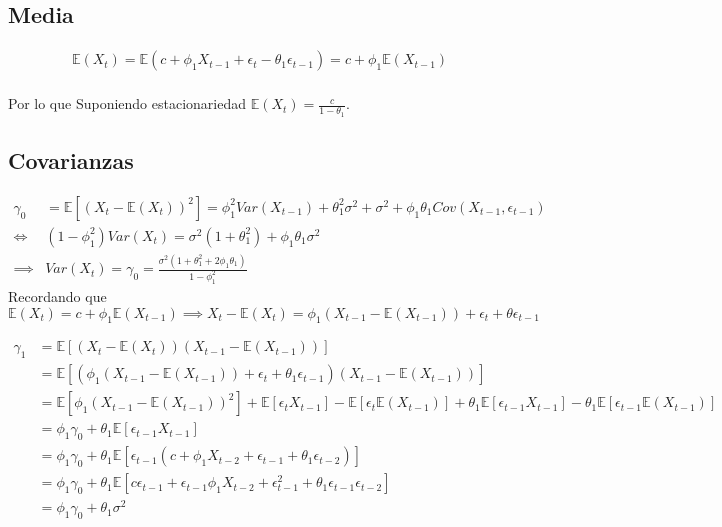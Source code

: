 \documentclass[
  a4paper,
  oneside,
  openany]{book}
\begin{document}
\hypertarget{media}{%
\subsection{Media}\label{media}}

\[
\begin{array}{l}
\mathbb{E}(X_t)=\mathbb{E}(c+ \phi_1X_{t-1}+\epsilon_t-\theta_1\epsilon_{t-1})=c+ \phi_1\mathbb{E}(X_{t-1})\\
\end{array}
\]

Por lo que Suponiendo estacionariedad \(\mathbb{E}(X_t) = \frac{c}{1-\theta_1}\).

\hypertarget{covarianzas}{%
\subsection{Covarianzas}\label{covarianzas}}

\[
\begin{split}
\gamma_0 &=\mathbb{E}\left[(X_t-\mathbb{E}(X_t))^2\right]=\phi_1^2Var(X_{t-1})+\theta_1^2\sigma^2+\sigma^2+\phi_1\theta_1Cov(X_{t-1}, \epsilon_{t-1})\\
\Longleftrightarrow & (1-\phi_1^2)Var(X_t) = \sigma^2(1+\theta_1^2)+\phi_1\theta_1\sigma^2\\
\implies & Var(X_t) = \gamma_0 = \frac{\sigma^2(1+\theta_1^2+2\phi_1\theta_1)}{1-\phi_1^2}
\end{split}
\]
Recordando que \(\mathbb{E}(X_t) = c+ \phi_1\mathbb{E}(X_{t-1}) \implies X_t-\mathbb{E}(X_t) = \phi_1(X_{t-1}-\mathbb{E}(X_{t-1}))+\epsilon_t+\theta\epsilon_{t-1}\)

\[
\begin{split}
\gamma_1 & =\mathbb{E}[(X_t-\mathbb{E}(X_t))(X_{t-1}-\mathbb{E}(X_{t-1}))]\\
& = \mathbb{E}\left[(\phi_1(X_{t-1}-\mathbb{E}(X_{t-1}))+\epsilon_t+\theta_1\epsilon_{t-1})(X_{t-1}-\mathbb{E}(X_{t-1}))\right]\\
& = \mathbb{E}\left[\phi_1(X_{t-1}-\mathbb{E}(X_{t-1}))^2\right] + \mathbb{E}\left[\epsilon_tX_{t-1}\right]-\mathbb{E}\left[\epsilon_t\mathbb{E}(X_{t-1})\right]+\theta_1\mathbb{E}\left[\epsilon_{t-1}X_{t-1}\right]-\theta_1\mathbb{E}[\epsilon_{t-1}\mathbb{E}(X_{t-1})]\\
&= \phi_1\gamma_0+\theta_1\mathbb{E}[\epsilon_{t-1}X_{t-1}]\\
&= \phi_1\gamma_0 + \theta_1\mathbb{E}[\epsilon_{t-1}(c+\phi_1X_{t-2}+\epsilon_{t-1}+\theta_1\epsilon_{t-2})]\\
&= \phi_1\gamma_0 +\theta_1\mathbb{E}\left[c\epsilon_{t-1}+\epsilon_{t-1}\phi_1X_{t-2}+\epsilon_{t-1}^2+\theta_1\epsilon_{t-1}\epsilon_{t-2}\right]\\
&= \phi_1\gamma_0+\theta_1\sigma^2
\end{split}
\]
\end{document}
